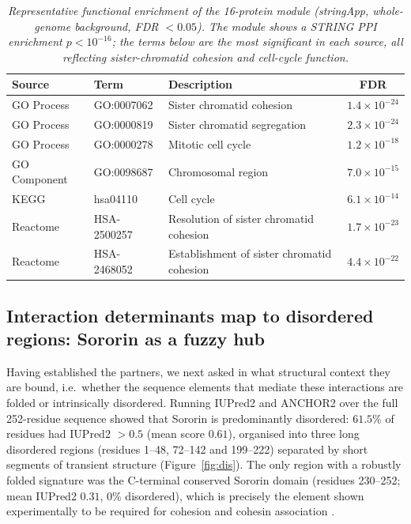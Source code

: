 \documentclass[11pt]{article}
\begin{document}
\begin{table}[htbp]
\centering
\caption{\textit{Representative functional enrichment of the 16-protein module (stringApp, whole-genome background, FDR $<0.05$). The module shows a STRING PPI enrichment $p<10^{-16}$; the terms below are the most significant in each source, all reflecting sister-chromatid cohesion and cell-cycle function.}}
\label{tab:enrich}
\small
\begin{tabular}{lllc}
\toprule
Source & Term & Description & FDR \\
\midrule
GO Process & GO:0007062 & Sister chromatid cohesion & $1.4\times10^{-24}$ \\
GO Process & GO:0000819 & Sister chromatid segregation & $2.3\times10^{-24}$ \\
GO Process & GO:0000278 & Mitotic cell cycle & $1.2\times10^{-18}$ \\
GO Component & GO:0098687 & Chromosomal region & $7.0\times10^{-15}$ \\
KEGG & hsa04110 & Cell cycle & $6.1\times10^{-14}$ \\
Reactome & HSA-2500257 & Resolution of sister chromatid cohesion & $1.7\times10^{-23}$ \\
Reactome & HSA-2468052 & Establishment of sister chromatid cohesion & $4.4\times10^{-22}$ \\
\bottomrule
\end{tabular}
\end{table}

\FloatBarrier
\subsection{Interaction determinants map to disordered regions: Sororin as a fuzzy hub}
Having established the partners, we next asked in what structural context they are bound, i.e.\ whether the sequence elements that mediate these interactions are folded or intrinsically disordered. Running IUPred2 and ANCHOR2 over the full 252-residue sequence showed that Sororin is predominantly disordered: $61.5\%$ of residues had IUPred2 $>0.5$ (mean score $0.61$), organised into three long disordered regions (residues 1--48, 72--142 and 199--222) separated by short segments of transient structure (Figure~\ref{fig:dis}). The only region with a robustly folded signature was the C-terminal conserved Sororin domain (residues 230--252; mean IUPred2 $0.31$, $0\%$ disordered), which is precisely the element shown experimentally to be required for cohesion and cohesin association \citep{wu2011}.
\end{document}
